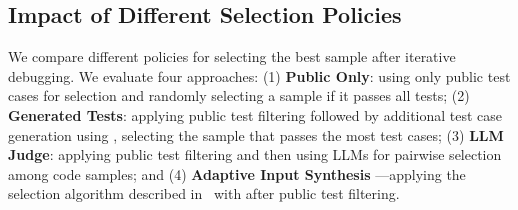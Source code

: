 \subsection{Impact of Different Selection Policies}
\label{sec:ablation_selection}
\begin{table}[h]
\centering
{}
\caption{\textbf{Pass@1 Performance comparison between different selection methods on LiveCodeBench(v4).} 
Bold text denotes the best performance of the same model. 
"Qwen-Coder", "R1-Distill" is short for "Qwen2.5-Coder-Instruct" and "DeepSeek-R1-Distill-Qwen". Results are obtained with N=8 and temperature=0.7. \textit{Our Adaptive Input Synthesis method achieves better accuracy over other methods.}}
\label{tab:diff_selection}
\vspace{-2mm}
\end{table}
We compare different policies for selecting the best sample after iterative debugging. We evaluate four approaches: 
(1) \textbf{Public Only}: using only public test cases for selection and randomly selecting a sample if it passes all tests; (2) \textbf{Generated Tests}: applying public test filtering followed by additional test case generation using \fouromini, selecting the sample that passes the most test cases; (3) \textbf{LLM Judge}: applying public test filtering and then using LLMs for pairwise selection among code samples; and (4) \textbf{Adaptive Input Synthesis} —applying the selection algorithm described in~ with \fouromini after public test filtering. %

